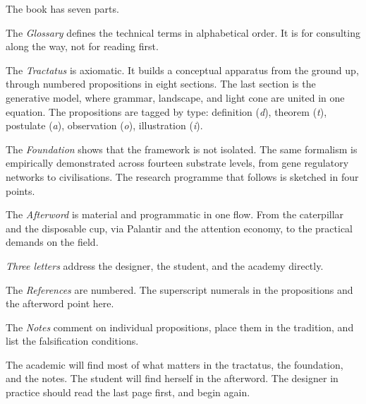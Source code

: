 \begin{widebody}
\begin{foreordbody}

The book has seven parts.

The \textit{Glossary} defines the technical terms in alphabetical order. It is for consulting along the way, not for reading first.

The \textit{Tractatus} is axiomatic. It builds a conceptual apparatus from the ground up, through numbered propositions in eight sections. The last section is the generative model, where grammar, landscape, and light cone are united in one equation. The propositions are tagged by type: definition (\textit{d}), theorem (\textit{t}), postulate (\textit{a}), observation (\textit{o}), illustration (\textit{i}).

The \textit{Foundation} shows that the framework is not isolated. The same formalism is empirically demonstrated across fourteen substrate levels, from gene regulatory networks to civilisations. The research programme that follows is sketched in four points.

The \textit{Afterword} is material and programmatic in one flow. From the caterpillar and the disposable cup, via Palantir and the attention economy, to the practical demands on the field.

\textit{Three letters} address the designer, the student, and the academy directly.

The \textit{References} are numbered. The superscript numerals in the propositions and the afterword point here.

The \textit{Notes} comment on individual propositions, place them in the tradition, and list the falsification conditions.

The academic will find most of what matters in the tractatus, the foundation, and the notes. The student will find herself in the afterword. The designer in practice should read the last page first, and begin again.

\end{foreordbody}
\end{widebody}
